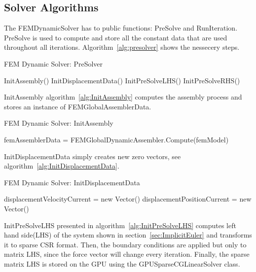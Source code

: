 \documentclass[en]{minipw} %
\begin{document}
\subsection{Solver Algorithms}
The FEMDynamicSolver has to public functions: PreSolve and RunIteration. PreSolve is used to compute and store all the constant data that are used throughout all iterations. Algorithm~\ref{alg:presolver} shows the nessecery steps.

\begin{algorithm}
\caption{FEM Dynamic Solver: PreSolver}
\label{alg:presolver}
\begin{algorithmic}[1]
\State InitAssembly()
\State InitDisplacementData()
\State InitPreSolveLHS()
\State InitPreSolveRHS()
\EndProcedure
\end{algorithmic}
\end{algorithm}

InitAssembly algorithm~\ref{alg:InitAssembly} computes the assembly process and stores an instance of FEMGlobalAssemblerData.

\begin{algorithm}
\caption{FEM Dynamic Solver: InitAssembly}
\label{alg:InitAssembly}
\begin{algorithmic}[1]
\State femAssemblerData = FEMGlobalDynamicAssembler.Compute(femModel)
\EndProcedure
\end{algorithmic}
\end{algorithm}

InitDisplacementData simply creates new zero vectors, see algorithm~\ref{alg:InitDisplacementData}.
 
\begin{algorithm}
\caption{FEM Dynamic Solver: InitDisplacementData}
\label{alg:InitDisplacementData}
\begin{algorithmic}[1]
\State displacementVelocityCurrent = new Vector()
\State displacementPositionCurrent = new Vector()
\EndProcedure
\end{algorithmic}
\end{algorithm}

InitPreSolveLHS presented in algorithm~\ref{alg:InitPreSolveLHS} computes left hand side(LHS) of the system shown in section~\ref{sec:ImplicitEuler} and transforms it to sparse CSR format. Then, the boundary conditions are applied but only to matrix LHS, since the force vector will change every iteration. Finally, the sparse matrix LHS is stored on the GPU using the GPUSparseCGLinearSolver class. 
\end{document}
